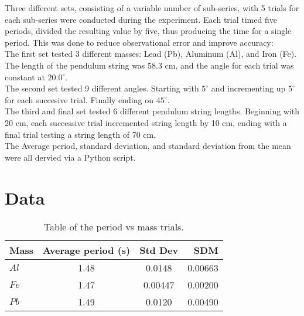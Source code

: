 \documentclass{article}
\begin{document}
Three different sets, consisting of a variable number of sub-series, with 5 trials for each
sub-series were conducted during the experiment.  Each trial timed five periods, divided 
the resulting value by five, thus producing the time for a single period.  This was done to 
reduce observational error and improve accuracy:\\

The first set tested 3 different masses: Lead (Pb), Aluminum (Al), and Iron (Fe).  The length
of the pendulum string was 58.3 cm, and the angle for each trial was constant at $20.0^{\circ}$.\\

The second set tested 9 different angles.  Starting with $5^{\circ}$ and incrementing up $5^{\circ}$
for each succesive trial.  Finally ending on $45^{\circ}$.\\

The third and final set tested 6 different pendulum string lengths. Beginning with 20 cm, each
successive trial incremented string length by 10 cm, ending with a final trial testing a string
length of 70 cm.\\

The Average period, standard deviation, and standard deviation from the mean were all dervied
via a Python script.



\section{Data}

\begin{table}[h]
  \begin{center}
    \caption{Table of the period vs mass trials.}
    \label{tab:table1}
    \begin{tabular}{l|c|c|r} %
      \textbf{Mass} & \textbf{Average period (s)} & \textbf{Std Dev} & \textbf{SDM}\\
      \hline
      $Al$ & 1.48 & 0.0148 & 0.00663\\
      $Fe$ & 1.47 & 0.00447 & 0.00200\\
      $Pb$ & 1.49 & 0.0120 & 0.00490\\
    \end{tabular}
  \end{center}
\end{table}
\end{document}
